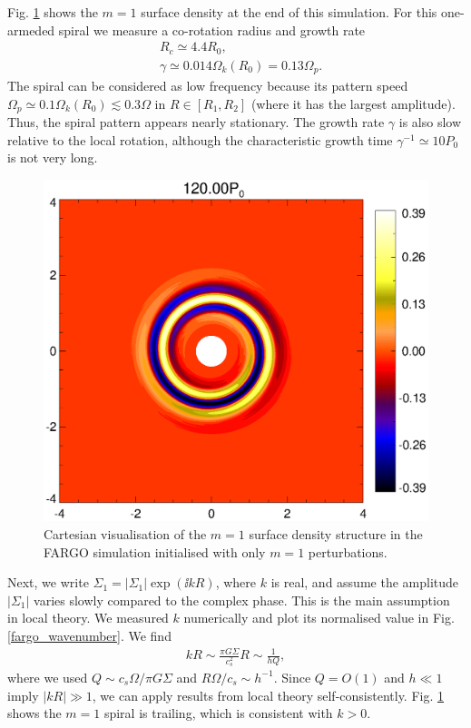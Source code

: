 Fig. \ref{2d_fargo_viz} shows the $m=1$ surface density
at the end of this simulation. For this one-armeded spiral
we measure a co-rotation radius and growth rate  
\begin{align*}
  &R_c \simeq 4.4R_0,\\
  &\gamma\simeq 0.014\Omega_k(R_0) = 0.13\Omega_p. 
\end{align*}
The spiral can be considered as low frequency because its 
pattern speed $\Omega_p \simeq 0.1\Omega_k(R_0)\lesssim 0.3\Omega$ in
$R\in[R_{1},R_{2}]$ (where it has the largest amplitude). Thus, the spiral 
pattern appears nearly stationary. The growth rate $\gamma$ is also slow
relative to the local rotation, although the characteristic growth
time $\gamma^{-1} \simeq 10P_0$ is not very long.  
\begin{figure}
  \includegraphics[width=\linewidth]{figures/polarxy2_dens120_fargo.ps}
  \caption{Cartesian visualisation of the $m=1$ surface density
    structure in the FARGO simulation initialised with only $m=1$
    perturbations. 
    \label{2d_fargo_viz}} 
\end{figure}   

Next, we write $\Sigma_1 = 
|\Sigma_1|\exp{(\ii kR)}$, where $k$ is real, and assume the amplitude
$|\Sigma_1|$ varies slowly compared to the complex phase. This is the
main assumption in local theory. We measured $k$ numerically and plot
its normalised value in Fig. \ref{fargo_wavenumber}. We find 
\begin{align*}
  kR \sim \frac{\pi G \Sigma}{c_s^2}R \sim \frac{1}{hQ}, 
\end{align*}
where we used $Q\sim c_s\Omega/\pi G \Sigma$ and $R\Omega/c_s\sim
h^{-1}$. Since $Q=O(1)$ and $h\ll 1$ imply $|kR|\gg 1$, we 
can apply results from local theory
self-consistently. Fig. \ref{2d_fargo_viz} shows the $m=1$ spiral is
trailing, which is consistent with $k>0$. 

